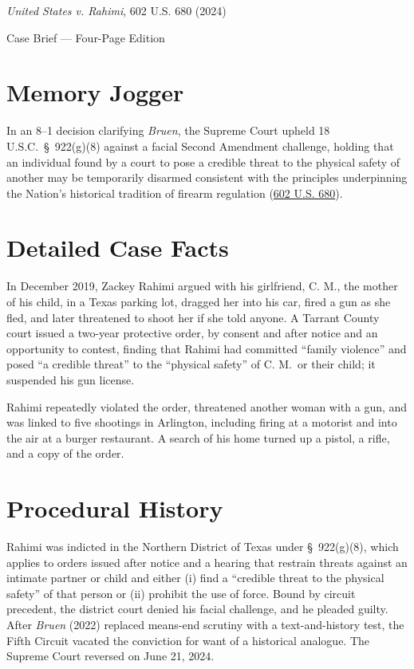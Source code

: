 \documentclass[12pt]{article}
\begin{document}
\begin{center}
{\LARGE \textit{United States v. Rahimi}, 602 U.S. 680 (2024)\par}
\vspace{0.8em}
{\large Case Brief --- Four-Page Edition\par}
\end{center}
\vspace{1em}

\section{Memory Jogger}

In an 8--1 decision clarifying \textit{Bruen}, the Supreme Court upheld 18 U.S.C.\ \S\ 922(g)(8) against a facial Second Amendment challenge, holding that an individual found by a court to pose a credible threat to the physical safety of another may be temporarily disarmed consistent with the principles underpinning the Nation's historical tradition of firearm regulation (\href{https://www.law.cornell.edu/supremecourt/text/22-915}{602 U.S. 680}).

\section{Detailed Case Facts}

In December 2019, Zackey Rahimi argued with his girlfriend, C. M., the mother of his child, in a Texas parking lot, dragged her into his car, fired a gun as she fled, and later threatened to shoot her if she told anyone. A Tarrant County court issued a two-year protective order, by consent and after notice and an opportunity to contest, finding that Rahimi had committed ``family violence'' and posed ``a credible threat'' to the ``physical safety'' of C. M.\ or their child; it suspended his gun license.

Rahimi repeatedly violated the order, threatened another woman with a gun, and was linked to five shootings in Arlington, including firing at a motorist and into the air at a burger restaurant. A search of his home turned up a pistol, a rifle, and a copy of the order.

\section{Procedural History}

Rahimi was indicted in the Northern District of Texas under \S\ 922(g)(8), which applies to orders issued after notice and a hearing that restrain threats against an intimate partner or child and either (i) find a ``credible threat to the physical safety'' of that person or (ii) prohibit the use of force. Bound by circuit precedent, the district court denied his facial challenge, and he pleaded guilty. After \textit{Bruen} (2022) replaced means-end scrutiny with a text-and-history test, the Fifth Circuit vacated the conviction for want of a historical analogue. The Supreme Court reversed on June 21, 2024.
\end{document}
